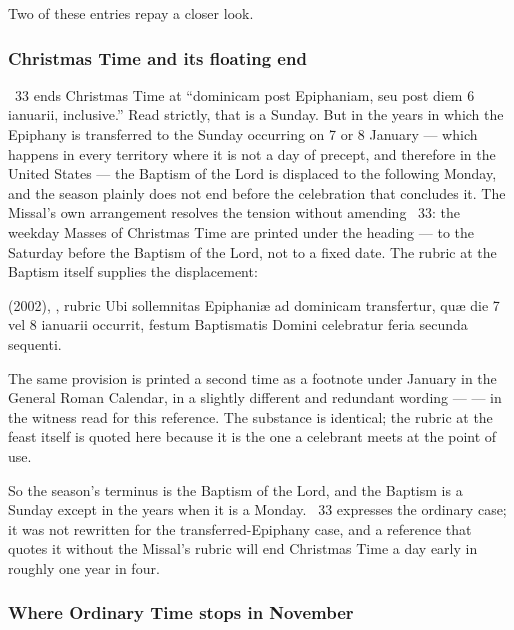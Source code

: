 Two of these entries repay a closer look.

\subsubsection{Christmas Time and its floating end}

~33 ends Christmas Time at ``dominicam post Epiphaniam, seu post diem 6 ianuarii,
inclusive.'' Read strictly, that is a Sunday. But in the years in which the Epiphany is transferred
to the Sunday occurring on 7 or 8 January --- which happens in every territory where it is not a day
of precept, and therefore in the United States --- the Baptism of the Lord is displaced to the
following Monday, and the season plainly does not end before the celebration that concludes it. The
Missal's own arrangement resolves the tension without amending ~33: the weekday Masses of
Christmas Time are printed under the heading  --- to the Saturday before the Baptism of the
Lord, not to a fixed date. The rubric at the Baptism itself supplies the displacement:

\begin{normtext}{ (2002), , rubric}
Ubi sollemnitas Epiphaniæ ad dominicam transfertur, quæ die 7 vel 8 ianuarii occurrit, festum
Baptismatis Domini celebratur feria secunda sequenti.
\end{normtext}

The same provision is printed a second time as a footnote under January in the General Roman
Calendar, in a slightly different and redundant wording ---  --- in the witness read for this reference. The substance is identical; the rubric at the
feast itself is quoted here because it is the one a celebrant meets at the point of use.

So the season's terminus is the Baptism of the Lord, and the Baptism is a Sunday except in the years
when it is a Monday. ~33 expresses the ordinary case; it was not rewritten for the
transferred-Epiphany case, and a reference that quotes it without the Missal's rubric will end
Christmas Time a day early in roughly one year in four.

\subsubsection{Where Ordinary Time stops in November}

